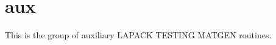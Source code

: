 \hypertarget{group__aux__matgen}{}\section{aux}
\label{group__aux__matgen}
This is the group of auxiliary L\+A\+P\+A\+C\+K T\+E\+S\+T\+I\+N\+G M\+A\+T\+G\+E\+N routines. 